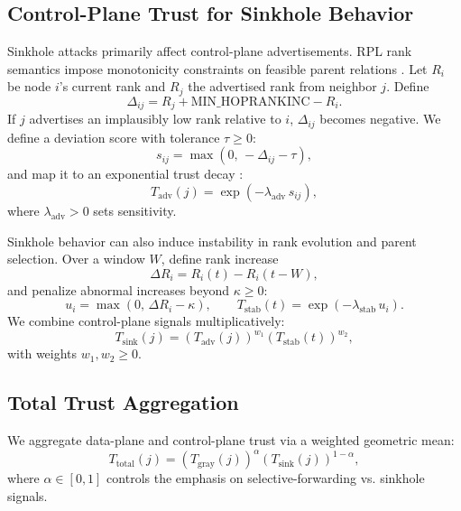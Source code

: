 \documentclass[11pt,a4paper]{article}
\begin{document}
\subsection{Control-Plane Trust for Sinkhole Behavior}
\label{subsec:sinkhole}
Sinkhole attacks primarily affect control-plane advertisements. RPL rank semantics impose monotonicity constraints on feasible parent relations \citep{rfc6550}. Let $R_i$ be node $i$’s current rank and $R_j$ the advertised rank from neighbor $j$. Define
\begin{equation}
\Delta_{ij}=R_j+\mathrm{MIN\_HOPRANKINC}-R_i.
\end{equation}
If $j$ advertises an implausibly low rank relative to $i$, $\Delta_{ij}$ becomes negative. We define a deviation score with tolerance $\tau\ge 0$:
\begin{equation}
s_{ij}=\max(0,\,-\Delta_{ij}-\tau),
\end{equation}
and map it to an exponential trust decay \citep{sun2005trust,chen2010trust}:
\begin{equation}
T_{\text{adv}}(j)=\exp(-\lambda_{\text{adv}}\,s_{ij}),
\end{equation}
where $\lambda_{\text{adv}}>0$ sets sensitivity.

Sinkhole behavior can also induce instability in rank evolution and parent selection. Over a window $W$, define rank increase
\begin{equation}
\Delta R_i=R_i(t)-R_i(t-W),
\end{equation}
and penalize abnormal increases beyond $\kappa\ge 0$:
\begin{equation}
u_i=\max(0,\,\Delta R_i-\kappa), \qquad
T_{\text{stab}}(t)=\exp(-\lambda_{\text{stab}}\,u_i).
\end{equation}
We combine control-plane signals multiplicatively:
\begin{equation}
T_{\text{sink}}(j)=\left(T_{\text{adv}}(j)\right)^{w_1}\left(T_{\text{stab}}(t)\right)^{w_2},
\end{equation}
with weights $w_1,w_2\ge 0$.

\subsection{Total Trust Aggregation}
\label{subsec:totaltrust}
We aggregate data-plane and control-plane trust via a weighted geometric mean:
\begin{equation}
T_{\text{total}}(j)=\left(T_{\text{gray}}(j)\right)^{\alpha}\left(T_{\text{sink}}(j)\right)^{1-\alpha},
\end{equation}
where $\alpha\in[0,1]$ controls the emphasis on selective-forwarding vs. sinkhole signals.
\end{document}
